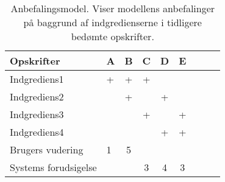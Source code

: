 \begin{table}[H]
  \centering
      \begin{tabular}{l|lccccccc}
      \textbf{Opskrifter}   & A        & B       & C       & D       & E   \\ \hline
      Indgrediens1          & +        & +       & +       &         &     \\
      Indgrediens2          &          & +       &         & +       &     \\
      Indgrediens3          &          &         & +       &         & +   \\
      Indgrediens4  		    &          &         &         & +       & +   \\ \hline
      Brugers vudering      & 1        & 5       &         &         &     \\
      Systems forudsigelse  &          &         & 3       & 4       &  3  \\


    \end{tabular}
  \caption{Anbefalingsmodel. Viser modellens anbefalinger på baggrund af indgredienserne i tidligere bedømte opskrifter.}\label{tabel:opskriftanbefaling}
\end{table}
